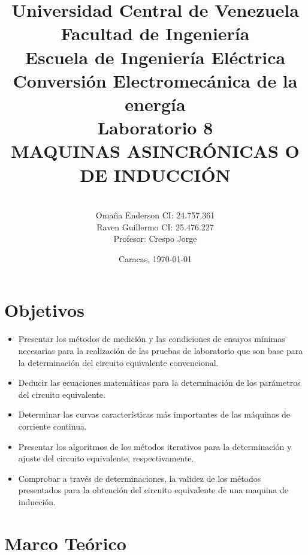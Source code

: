 \documentclass[11pt,letterpaper]{article}     %
\author{\\Omaña Enderson CI:  24.757.361 \\Raven Guillermo CI: 25.476.227\\Profesor: Crespo Jorge \vspace*{1in}}
\title{Universidad Central de Venezuela\\{ Facultad de Ingeniería\\Escuela de Ingeniería Eléctrica\\ Conversión Electromecánica de la energía\\\vspace*{1.5in} }Laboratorio 8\\MAQUINAS ASINCRÓNICAS O DE INDUCCIÓN\vspace*{1.35in}}
\date{Caracas, \today}
\begin{document}
\maketitle							%
\newpage
\tableofcontents
\newpage
\section{Objetivos}
\begin{itemize}
	\item Presentar los métodos de medición y las condiciones de ensayos mínimas necesarias para la realización de las pruebas de laboratorio que son base para la determinación del circuito equivalente convencional.
	\item Deducir las ecuaciones matemáticas para la determinación de los parámetros del circuito equivalente.
	\item Determinar las curvas características más importantes de las máquinas de corriente continua.
    \item Presentar los algoritmos de los métodos iterativos para la determinación y ajuste del circuito equivalente, respectivamente.
    \item Comprobar a través de determinaciones, la validez de los métodos presentados para la obtención del circuito equivalente de una maquina de inducción.
\end{itemize}
\section{Marco Teórico}
\end{document}
